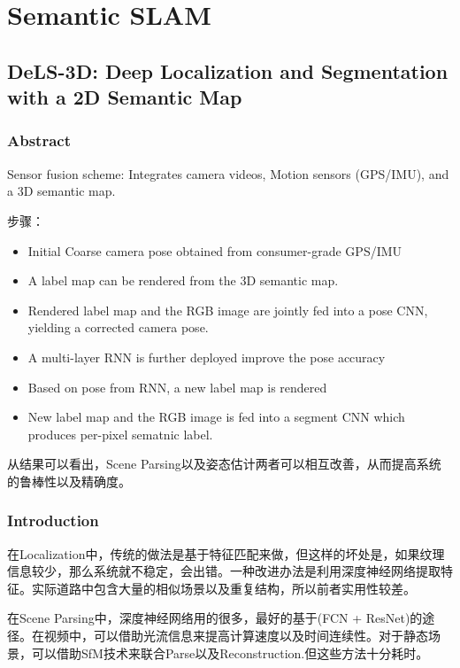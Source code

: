 \chapter{Semantic SLAM}

\section{DeLS-3D: Deep Localization and Segmentation with a 2D Semantic Map\cite{WangWang2018DeLS}}

\subsection{Abstract}

Sensor fusion scheme: Integrates camera videos, Motion sensors (GPS/IMU), and a 3D semantic map.

步骤：
\begin{itemize}
\item Initial Coarse camera pose obtained from consumer-grade GPS/IMU
\item A label map can be rendered from the 3D semantic map.
\item Rendered label map and the RGB image are jointly fed into a pose CNN, yielding a corrected camera pose.
\item A multi-layer RNN is further deployed improve the pose accuracy
\item Based on pose from RNN, a new label map is rendered
\item New label map and the RGB image is fed into a segment CNN which produces per-pixel sematnic label.
\end{itemize}

从结果可以看出，Scene Parsing以及姿态估计两者可以相互改善，从而提高系统的鲁棒性以及精确度。

\subsection{Introduction}

在Localization中，传统的做法是基于特征匹配来做，但这样的坏处是，如果纹理信息较少，那么系统就不稳定，会出错。一种改进办法是利用深度神经网络提取特征。实际道路中包含大量的相似场景以及重复结构，所以前者实用性较差。

在Scene Parsing中，深度神经网络用的很多，最好的基于(FCN + ResNet)的途径。在视频中，可以借助光流信息来提高计算速度以及时间连续性。对于静态场景，可以借助SfM技术来联合Parse以及Reconstruction.但这些方法十分耗时。

